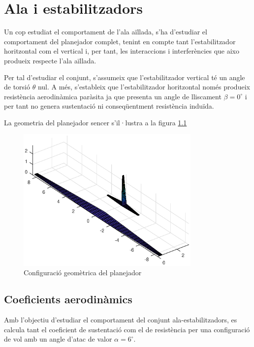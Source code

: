 \chapter{Ala i estabilitzadors}

Un cop estudiat el comportament de l'ala aïllada, s'ha d'estudiar el comportament del planejador complet, tenint en compte tant l'estabilitzador horitzontal com el vertical i, per tant, les interaccions i interferències que aixo produeix respecte l'ala aïllada.

Per tal d'estudiar el conjunt, s'assumeix que l'estabilitzador vertical té un angle de torsió $\theta$ nul. A més, s'estableix que l'estabilitzador horitzontal només produeix resistència aerodinàmica paràsita ja que presenta un angle de lliscament $\beta=0^{\circ}$ i per tant no genera sustentació ni conseqüentment resistència induïda.

La geometria del planejador sencer s'il·lustra a la figura \ref{glider}

 \begin{figure}[H]
 	\centering
 	\includegraphics[width=0.8\textwidth]{./plots/glider}
 	\caption{Configuració geomètrica del planejador}
 	\label{glider}
 \end{figure}

\section{Coeficients aerodinàmics}

Amb l'objectiu d'estudiar el comportament del conjunt ala-estabilitzadors, es calcula tant el coeficient de sustentació com el de resistència per una configuració de vol amb un angle d'atac de valor $\alpha=6^{\circ}$. 


